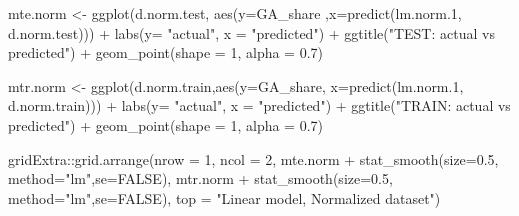 \documentclass[
]{article}
\newenvironment{Shaded}{\begin{snugshade}}{\end{snugshade}}
\newcommand{\AttributeTok}[1]{\textcolor[rgb]{0.77,0.63,0.00}{#1}}
\newcommand{\ConstantTok}[1]{\textcolor[rgb]{0.00,0.00,0.00}{#1}}
\newcommand{\DecValTok}[1]{\textcolor[rgb]{0.00,0.00,0.81}{#1}}
\newcommand{\FloatTok}[1]{\textcolor[rgb]{0.00,0.00,0.81}{#1}}
\newcommand{\FunctionTok}[1]{\textcolor[rgb]{0.00,0.00,0.00}{#1}}
\newcommand{\NormalTok}[1]{#1}
\newcommand{\OtherTok}[1]{\textcolor[rgb]{0.56,0.35,0.01}{#1}}
\newcommand{\SpecialCharTok}[1]{\textcolor[rgb]{0.00,0.00,0.00}{#1}}
\newcommand{\StringTok}[1]{\textcolor[rgb]{0.31,0.60,0.02}{#1}}
\begin{document}
\begin{Shaded}
\begin{Highlighting}[]
\NormalTok{mte.norm }\OtherTok{\textless{}{-}} \FunctionTok{ggplot}\NormalTok{(d.norm.test, }\FunctionTok{aes}\NormalTok{(}\AttributeTok{y=}\NormalTok{GA\_share ,}\AttributeTok{x=}\FunctionTok{predict}\NormalTok{(lm.norm}\FloatTok{.1}\NormalTok{, d.norm.test))) }\SpecialCharTok{+}
  \FunctionTok{labs}\NormalTok{(}\AttributeTok{y=} \StringTok{"actual"}\NormalTok{, }\AttributeTok{x =} \StringTok{"predicted"}\NormalTok{) }\SpecialCharTok{+} \FunctionTok{ggtitle}\NormalTok{(}\StringTok{"TEST: actual vs predicted"}\NormalTok{) }\SpecialCharTok{+} 
  \FunctionTok{geom\_point}\NormalTok{(}\AttributeTok{shape =} \DecValTok{1}\NormalTok{, }\AttributeTok{alpha =} \FloatTok{0.7}\NormalTok{)}

\NormalTok{mtr.norm }\OtherTok{\textless{}{-}} \FunctionTok{ggplot}\NormalTok{(d.norm.train,}\FunctionTok{aes}\NormalTok{(}\AttributeTok{y=}\NormalTok{GA\_share, }\AttributeTok{x=}\FunctionTok{predict}\NormalTok{(lm.norm}\FloatTok{.1}\NormalTok{, d.norm.train))) }\SpecialCharTok{+}
  \FunctionTok{labs}\NormalTok{(}\AttributeTok{y=} \StringTok{"actual"}\NormalTok{, }\AttributeTok{x =} \StringTok{"predicted"}\NormalTok{) }\SpecialCharTok{+} \FunctionTok{ggtitle}\NormalTok{(}\StringTok{"TRAIN: actual vs predicted"}\NormalTok{) }\SpecialCharTok{+} 
  \FunctionTok{geom\_point}\NormalTok{(}\AttributeTok{shape =} \DecValTok{1}\NormalTok{, }\AttributeTok{alpha =} \FloatTok{0.7}\NormalTok{)}

\NormalTok{gridExtra}\SpecialCharTok{::}\FunctionTok{grid.arrange}\NormalTok{(}\AttributeTok{nrow =} \DecValTok{1}\NormalTok{, }\AttributeTok{ncol =} \DecValTok{2}\NormalTok{, mte.norm }\SpecialCharTok{+} 
                        \FunctionTok{stat\_smooth}\NormalTok{(}\AttributeTok{size=}\FloatTok{0.5}\NormalTok{, }\AttributeTok{method=}\StringTok{"lm"}\NormalTok{,}\AttributeTok{se=}\ConstantTok{FALSE}\NormalTok{), }
\NormalTok{                        mtr.norm }\SpecialCharTok{+} \FunctionTok{stat\_smooth}\NormalTok{(}\AttributeTok{size=}\FloatTok{0.5}\NormalTok{, }\AttributeTok{method=}\StringTok{"lm"}\NormalTok{,}\AttributeTok{se=}\ConstantTok{FALSE}\NormalTok{),}
                        \AttributeTok{top =} \StringTok{"Linear model, Normalized dataset"}\NormalTok{)}
\end{Highlighting}
\end{Shaded}
\end{document}
